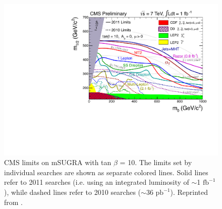\documentclass[dissertation.tex]{subfiles}
\begin{document}
\begin{figure}
	\centering
	\includegraphics[scale=0.6]{CMS_SUSY_2011Limits_tanb10}
	\caption{CMS limits on mSUGRA with tan $\beta$ = 10.  The limits set by individual searches are shown as separate colored lines.  Solid lines refer to 2011 searches (i.e. using an integrated luminosity of $\sim$1 $\mbox{fb}^{-1}$), while dashed lines refer to 2010 searches ($\sim$36 $\mbox{pb}^{-1}$).  Reprinted from \cite{CMS_mSUGRA}.}
	\label{fig:CMS_SUSY_2011Limits_tanb10}
\end{figure}
\end{document}
